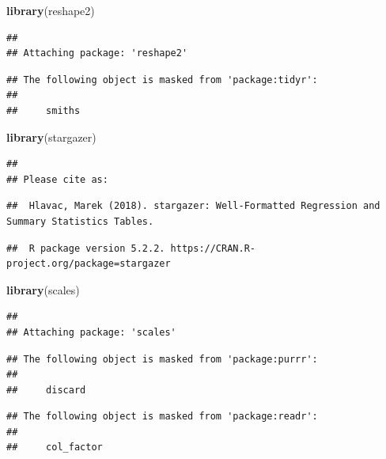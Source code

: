 \documentclass[]{article}
\newenvironment{Shaded}{\begin{snugshade}}{\end{snugshade}}
\newcommand{\KeywordTok}[1]{\textcolor[rgb]{0.13,0.29,0.53}{\textbf{#1}}}
\newcommand{\NormalTok}[1]{#1}
\begin{document}
\begin{Shaded}
\begin{Highlighting}[]
\KeywordTok{library}\NormalTok{(reshape2)}
\end{Highlighting}
\end{Shaded}

\begin{verbatim}
## 
## Attaching package: 'reshape2'
\end{verbatim}

\begin{verbatim}
## The following object is masked from 'package:tidyr':
## 
##     smiths
\end{verbatim}

\begin{Shaded}
\begin{Highlighting}[]
\KeywordTok{library}\NormalTok{(stargazer)}
\end{Highlighting}
\end{Shaded}

\begin{verbatim}
## 
## Please cite as:
\end{verbatim}

\begin{verbatim}
##  Hlavac, Marek (2018). stargazer: Well-Formatted Regression and Summary Statistics Tables.
\end{verbatim}

\begin{verbatim}
##  R package version 5.2.2. https://CRAN.R-project.org/package=stargazer
\end{verbatim}

\begin{Shaded}
\begin{Highlighting}[]
\KeywordTok{library}\NormalTok{(scales)}
\end{Highlighting}
\end{Shaded}

\begin{verbatim}
## 
## Attaching package: 'scales'
\end{verbatim}

\begin{verbatim}
## The following object is masked from 'package:purrr':
## 
##     discard
\end{verbatim}

\begin{verbatim}
## The following object is masked from 'package:readr':
## 
##     col_factor
\end{verbatim}
\end{document}
